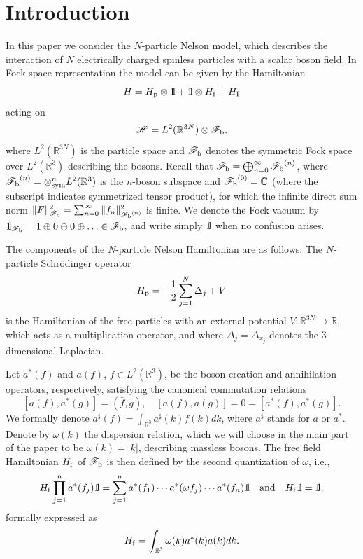 \documentclass[12pt]{article}
\def\bbbone{{\mathchoice {\rm 1\mskip-4mu l} {\rm 1\mskip-4mu l}
{\rm 1\mskip-4.5mu l} {\rm 1\mskip-5mu l}}}
\def\one{\bbbone}
\renewcommand{\d}{\displaystyle}
\providecommand{\BR}{{\mathbb{R}^3 }}
\providecommand{\BRN}{{\mathbb{R}^{3N} }}
\providecommand{\LR}{{L^2(\BR)}}
\providecommand{\LRN}{{L^2(\BRN)}}
\providecommand{\hn}{H}%
\providecommand{\ms}[1]{\mathscr{#1}}
\providecommand{\ffff}{{\mathscr{F}_{\rm b}}}
\providecommand{\add}{a^\ast}
\providecommand{\ass}{a^\sharp}
\providecommand{\hf}{H_{\rm f}}
\providecommand{\hi}{H_{\rm I}}
\providecommand{\hp}{H_{\rm p}}
\providecommand{\hhh}{\ms H} %
\providecommand{\1}{\mathbb{1}}
\providecommand {\R} {\ensuremath{\mathbb{R}}}
\providecommand {\F}  {\ffff}
\begin{document}
\newpage
\section{Introduction}
In this paper we consider the $N$-particle Nelson model, which describes the interaction
of $N$ electrically charged spinless particles with a scalar boson field.
In Fock space representation the model can be given by the Hamiltonian
\begin{equation} \label{Ham}
\hn = \hp\otimes \one +\one \otimes \hf  + \hi
\end{equation}
acting on
$$
\hhh=\LRN \otimes\ffff,
$$
where $L^{2}(\R^{3N})$ is the particle space and $\F$ denotes the symmetric Fock space over $\LR$
describing the bosons. Recall that $\F = \bigoplus_{n=0}^{\infty} \F^{(n)}$, where $\F^{(n)} =
{{\otimes}^n_{\rm sym}}\LR$ is the $n$-boson subspace and $\F^{(0)} = \mathbb{C}$ (where the
subscript indicates symmetrized tensor product), for which the infinite direct sum norm
$\|F\|_{\ffff }^2 = \sum_{n=0}^{\infty}\|f_n\|_{\F^{(n)}}^2$ is finite. We denote the Fock vacuum
by $\one_\ffff =1\oplus 0\oplus 0\oplus\ldots \in\ffff $, and write simply $\one$ when no confusion
arises.

The components of the $N$-particle Nelson Hamiltonian are as follows. The $N$-particle Schr\"odinger
operator
$$
\hp = -\frac{1}{2} \sum_{j=1}^N  \Delta_j + V
$$
is the Hamiltonian of the free particles with  an external potential $V: \BRN  \to \R$, which
acts as a multiplication operator, and where $\Delta_j=\Delta_{x_j}$ denotes the 3-dimensional
Laplacian.

Let $\add (f)$ and $a(f)$, $f\in\LR$, be the boson creation and annihilation operators, respectively,
satisfying the  canonical commutation relations
$$[a(f),\add(g)]=(\bar f, g),\quad
[a(f),a(g)]=0=
[\add(f), \add(g)].$$
We formally denote $\d \ass(f)=\int _\BR \ass(k)
f(k) dk$, where $\ass$
stands for $a$ or $\add$. Denote by $\omega(k)$ the dispersion relation, which we will choose in
the main part of the paper to be $\omega(k) = |k|$, describing massless bosons. The free field
Hamiltonian $\hf$ of $\ffff $ is then defined by the second quantization of $\omega$,
i.e.,
$$
\hf \prod_{j=1}^n \add(f_j)\one= \sum_{j=1}^n \add(f_1)\cdots\add(\omega f_j)\cdots\add(f_n)\one
\quad \mbox{and} \quad \hf \one=\one,
$$
formally expressed as
$$
\hf = \int_\BR \omega(k) \add(k)a(k)  dk.
$$
\end{document}
